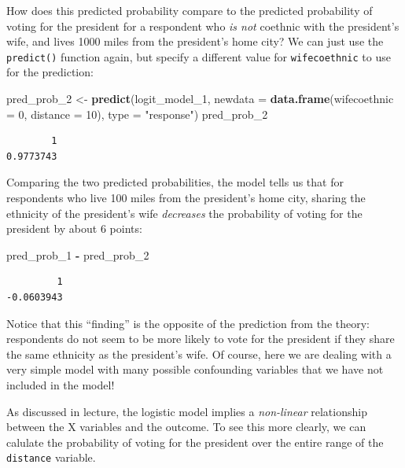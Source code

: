 \documentclass[]{article}
\newenvironment{Shaded}{\begin{snugshade}}{\end{snugshade}}
\newcommand{\KeywordTok}[1]{\textcolor[rgb]{0.13,0.29,0.53}{\textbf{#1}}}
\newcommand{\DataTypeTok}[1]{\textcolor[rgb]{0.13,0.29,0.53}{#1}}
\newcommand{\DecValTok}[1]{\textcolor[rgb]{0.00,0.00,0.81}{#1}}
\newcommand{\StringTok}[1]{\textcolor[rgb]{0.31,0.60,0.02}{#1}}
\newcommand{\OperatorTok}[1]{\textcolor[rgb]{0.81,0.36,0.00}{\textbf{#1}}}
\newcommand{\NormalTok}[1]{#1}
\theoremstyle{definition}
\theoremstyle{definition}
\theoremstyle{definition}
\theoremstyle{remark}
\begin{document}
How does this predicted probability compare to the predicted probability
of voting for the president for a respondent who \emph{is not} coethnic
with the president's wife, and lives 1000 miles from the president's
home city? We can just use the \texttt{predict()} function again, but
specify a different value for \texttt{wifecoethnic} to use for the
prediction:

\begin{Shaded}
\begin{Highlighting}[]
\NormalTok{pred_prob_}\DecValTok{2}\NormalTok{ <-}\StringTok{ }\KeywordTok{predict}\NormalTok{(logit_model_}\DecValTok{1}\NormalTok{, }\DataTypeTok{newdata =} \KeywordTok{data.frame}\NormalTok{(}\DataTypeTok{wifecoethnic =} \DecValTok{0}\NormalTok{, }\DataTypeTok{distance =} \DecValTok{10}\NormalTok{), }\DataTypeTok{type =} \StringTok{"response"}\NormalTok{)}
\NormalTok{pred_prob_}\DecValTok{2}
\end{Highlighting}
\end{Shaded}

\begin{verbatim}
        1 
0.9773743 
\end{verbatim}

Comparing the two predicted probabilities, the model tells us that for
respondents who live 100 miles from the president's home city, sharing
the ethnicity of the president's wife \emph{decreases} the probability
of voting for the president by about 6 points:

\begin{Shaded}
\begin{Highlighting}[]
\NormalTok{pred_prob_}\DecValTok{1} \OperatorTok{-}\StringTok{ }\NormalTok{pred_prob_}\DecValTok{2}
\end{Highlighting}
\end{Shaded}

\begin{verbatim}
         1 
-0.0603943 
\end{verbatim}

Notice that this ``finding'' is the opposite of the prediction from the
theory: respondents do not seem to be more likely to vote for the
president if they share the same ethnicity as the president's wife. Of
course, here we are dealing with a very simple model with many possible
confounding variables that we have not included in the model!

As discussed in lecture, the logistic model implies a \emph{non-linear}
relationship between the X variables and the outcome. To see this more
clearly, we can calulate the probability of voting for the president
over the entire range of the \texttt{distance} variable.
\end{document}
